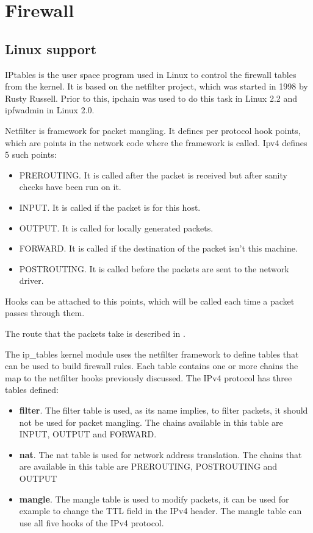 \section{Firewall}
\label{sub-sec:firewall-impl}

\subsection{Linux support}
\label{sub-sec:firewall-lin}

IPtables is the user space program used in Linux to control the firewall tables from the kernel. It is based
on the netfilter project, which was started in 1998 by Rusty Russell. Prior to this, ipchain was used to do
this task in Linux 2.2 and ipfwadmin in Linux 2.0.

Netfilter is framework for packet mangling. It defines per protocol hook points, which are points in the network code
where the framework is called. Ipv4 defines 5 such points:
\begin{itemize}
  \item PREROUTING. It is called after the packet is received but after sanity checks have been run on it.
  \item INPUT. It is called if the packet is for this host.
  \item OUTPUT.	It is called for locally generated packets.
  \item FORWARD. It is called if the destination of the packet isn't this machine.
  \item POSTROUTING. It is called before the packets are sent to the network driver.
\end{itemize}
Hooks can be attached to this points, which will be called each time a packet passes through them.

The route that the packets take is described in .

The ip_tables kernel module uses the netfilter framework to define tables that can be used to build firewall rules.
Each table contains one or more chains the map to the netfilter hooks previously discussed. 
The IPv4 protocol has three tables defined:
\begin{itemize}
  \item \textbf{filter}. The filter table is used, as its name implies, to filter packets, it should not be used for packet mangling. The chains
available in this table are INPUT, OUTPUT and FORWARD.
  \item \textbf{nat}. The nat table is used for network address translation. The chains that are available in this table are PREROUTING,
 POSTROUTING and OUTPUT
  \item \textbf{mangle}. The mangle table is used to modify packets, it can be used for example to change the TTL field in
the IPv4 header. The mangle table can use all five hooks of the IPv4 protocol.
\end{itemize}

